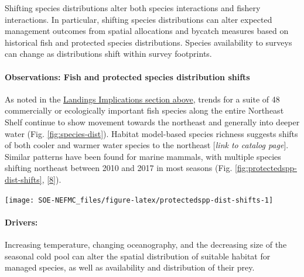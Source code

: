 \documentclass[
  10pt,
]{article}
\let\origfigure\figure
\let\endorigfigure\endfigure
\renewenvironment{figure}[1][2] {
    \expandafter\origfigure\expandafter[H]
} {
    \endorigfigure
}
\begin{document}
Shifting species distributions alter both species interactions and fishery interactions. In particular, shifting species distributions can alter expected management outcomes from spatial allocations and bycatch measures based on historical fish and protected species distributions. Species availability to surveys can change as distributions shift within survey footprints.

\hypertarget{observations-fish-and-protected-species-distribution-shifts}{%
\paragraph{Observations: Fish and protected species distribution shifts}\label{observations-fish-and-protected-species-distribution-shifts}}

As noted in the \protect\hyperlink{implications}{Landings Implications section above}, trends for a suite of 48 commercially or ecologically important fish species along the entire Northeast Shelf continue to show movement towards the northeast and generally into deeper water (Fig. \ref{fig:species-dist}). Habitat model-based species richness suggests shifts of both cooler and warmer water species to the northeast {[}\emph{link to catalog page}{]}. Similar patterns have been found for marine mammals, with multiple species shifting northeast between 2010 and 2017 in most seasons (Fig. \ref{fig:protectedspp-dist-shifts}, {[}\protect\hyperlink{ref-chavez-rosales_detection_2022}{8}{]}).

\begin{figure}

{\centering \texttt{[image: SOE-NEFMC\_files/figure-latex/protectedspp-dist-shifts-1]} 

}

\caption{Direction and magnitude of core habitat shifts, represented by the length of the line of the seasonal weighted centroid for species with more than 70 km difference between 2010 and 2017 (tip of arrow).}\label{fig:protectedspp-dist-shifts}
\end{figure}

\hypertarget{drivers}{%
\paragraph{Drivers:}\label{drivers}}

Increasing temperature, changing oceanography, and the decreasing size of the seasonal cold pool can alter the spatial distribution of suitable habitat for managed species, as well as availability and distribution of their prey.
\end{document}
